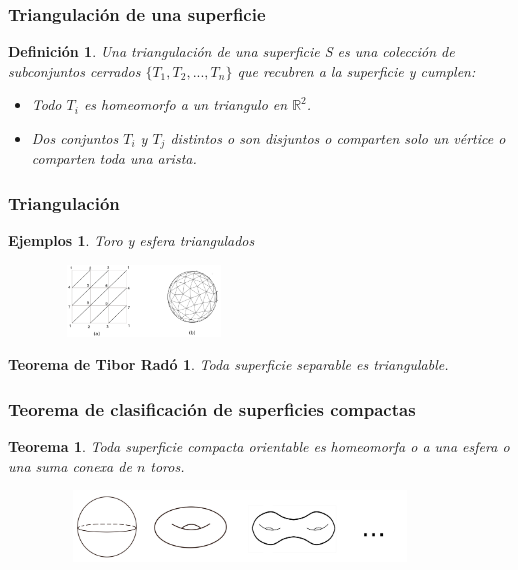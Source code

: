 \documentclass{beamer}
\newtheorem*{defi}{Definición}
\newtheorem*{teor}{Teorema}
\newtheorem*{teort}{Teorema de Tibor Radó}
\newtheorem*{ejem}{Ejemplos}
\begin{document}
\begin{frame}
\frametitle{Triangulación de una superficie}


\begin{defi}
Una triangulación de una superficie S es una colección de subconjuntos cerrados $\{T_1, T_2, ..., T_n\}$ que recubren a la superficie y cumplen:
\begin{itemize}
\item Todo $T_i$ es homeomorfo a un triangulo en $\mathbb{R}^2$.
\item Dos conjuntos $T_i$ y $T_j$ distintos o son disjuntos o comparten solo un vértice o comparten toda una arista.
\end{itemize}

\end{defi}
\end{frame}

\begin{frame}

\frametitle{Triangulación}
\begin{ejem}
Toro y esfera triangulados
\begin{figure}[htb]
\begin{center}
\includegraphics[width=2in,height=0.75in]{imagenes/diapo3.png} 
\end{center}
\end{figure}

\end{ejem}

\begin{teort}
Toda superficie separable es triangulable.
\end{teort}


\end{frame}

\begin{frame}
\frametitle{Teorema de clasificación de superficies compactas}
\begin{teor}
Toda superficie compacta orientable es homeomorfa o a una esfera o una suma conexa de $n$ toros.
\end{teor}
\begin{figure}[htb]
\begin{center}
\includegraphics[width=4in,height=0.75in]{imagenes/diapo4.png} 
\end{center}
\end{figure}

\end{frame}
\end{document}
